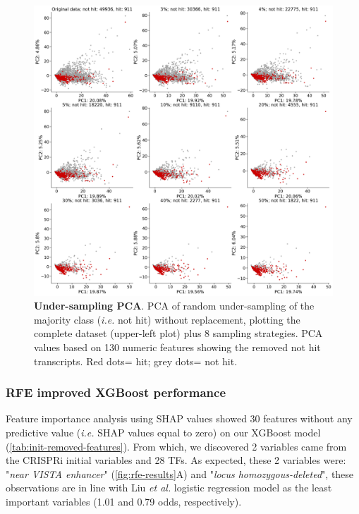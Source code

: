 \begin{figure}[ht!]
  \centering
  \includegraphics[scale=0.25]{plots/results/ml/pca.random.us.without.replacement.pdf}
  \caption[Under-sampling PCA]{\textbf{Under-sampling PCA}. PCA of random under-sampling of the majority class (\textit{i.e.} not hit) without replacement, plotting the complete dataset (upper-left plot) plus 8 sampling strategies. PCA values based on 130 numeric features showing the removed not hit transcripts. Red dots= hit; grey dots= not hit.}
  \label{fig:pca-under-sampling-without-r}
\end{figure}

\clearpage

\subsubsection{RFE improved XGBoost performance}
\label{sub-sec:rfe}

Feature importance analysis using SHAP values\autocite{shapley_SHAP_values} showed 30 features without any predictive value (\textit{i.e.} SHAP values equal to zero) on our XGBoost model (\autoref{tab:init-removed-features}). From which, we discovered 2 variables came from the CRISPRi initial variables and 28 TFs. As expected, these 2 variables were: "\textit{near VISTA enhancer}" (\autoref{fig:rfe-results}A) and "\textit{locus homozygous-deleted}", these observations are in line with Liu \textit{et al.}\autocite{liu_2017_crispri} logistic regression model as the least important variables (1.01  and 0.79 odds, respectively). 

